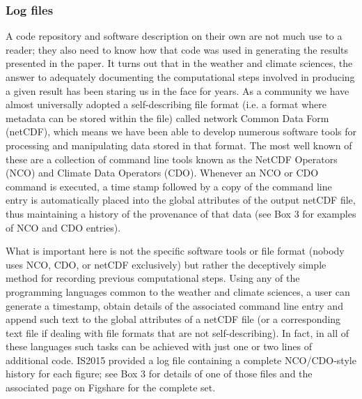 \subsubsection{Log files}\label{s:log_files}

A code repository and software description on their own are not much use to a reader; they also need to know how that code was used in generating the results presented in the paper. It turns out that in the weather and climate sciences, the answer to adequately documenting the computational steps involved in producing a given result has been staring us in the face for years. As a community we have almost universally adopted a self-describing file format (i.e. a format where metadata can be stored within the file) called network Common Data Form (netCDF), which means we have been able to develop numerous software tools for processing and manipulating data stored in that format. The most well known of these are a collection of command line tools known as the NetCDF Operators (NCO) and Climate Data Operators (CDO). Whenever an NCO or CDO command is executed, a time stamp followed by a copy of the command line entry is automatically placed into the global attributes of the output netCDF file, thus maintaining a history of the provenance of that data (see Box 3 for examples of NCO and CDO entries).

What is important here is not the specific software tools or file format (nobody uses NCO, CDO, or netCDF exclusively) but rather the deceptively simple method for recording previous computational steps. Using any of the programming languages common to the weather and climate sciences, a user can generate a timestamp, obtain details of the associated command line entry and append such text to the global attributes of a netCDF file (or a corresponding text file if dealing with file formats that are not self-describing). In fact, in all of these languages such tasks can be achieved with just one or two lines of additional code. IS2015 provided a log file containing a complete NCO/CDO-style history for each figure; see Box 3 for details of one of those files and the associated page on Figshare for the complete set.

